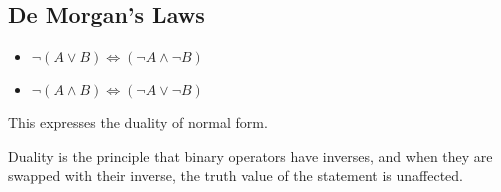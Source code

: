 \subsection{De Morgan's Laws}

\begin{itemize}
\item $\neg (A\lor B)\Leftrightarrow (\neg A\land \neg B)$
\item $\neg (A\land B)\Leftrightarrow (\neg A\lor \neg B)$
\end{itemize}

This expresses the duality of normal form.

Duality is the principle that binary operators have inverses, and when they are swapped with their inverse, the truth value of the statement is unaffected.

